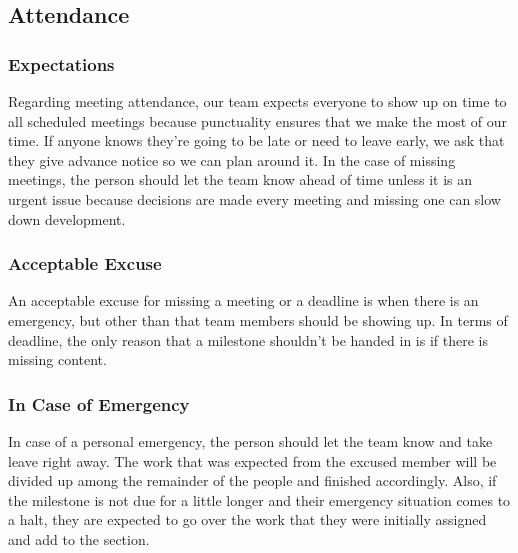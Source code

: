 \documentclass{article}
\begin{document}
\subsection*{Attendance}

\subsubsection*{Expectations}

Regarding meeting attendance, our team expects everyone to show up on time to all scheduled meetings because punctuality ensures that we make the most of our time. If anyone knows they’re going to be late or need to leave early, we ask that they give advance notice so we can plan around it. In the case of missing meetings, the person should let the team know ahead of time unless it is an urgent issue because decisions are made every meeting and missing one can slow down development.

\subsubsection*{Acceptable Excuse}

An acceptable excuse for missing a meeting or a deadline is when there is an emergency, but other than that team members should be showing up. In terms of deadline, the only reason that a milestone shouldn’t be handed in is if there is missing content.


\subsubsection*{In Case of Emergency}

In case of a personal emergency, the person should let the team know and take leave right away. The work that was expected from the excused member will be divided up among the remainder of the people and finished accordingly. Also, if the milestone is not due for a little longer and their emergency situation comes to a halt, they are expected to go over the work that they were initially assigned and add to the section.
\end{document}
